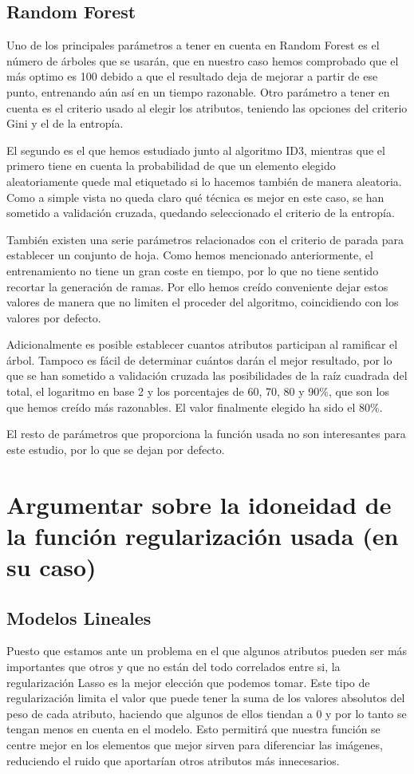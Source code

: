 \documentclass{article}
\begin{document}
	 \subsection{Random Forest}
	 Uno de los principales parámetros a tener en cuenta en Random Forest es el número de árboles que se usarán, que en nuestro caso hemos comprobado que el más optimo es 100 debido a que el resultado deja de mejorar a partir de ese punto, entrenando aún así en un tiempo razonable. Otro parámetro a tener en cuenta es el criterio usado al elegir los atributos, teniendo las opciones del criterio Gini y el de la entropía.
	 \par
	 El segundo es el que hemos estudiado junto al algoritmo ID3, mientras que el primero tiene en cuenta la probabilidad de que un elemento elegido aleatoriamente quede mal etiquetado si lo hacemos también de manera aleatoria. Como a simple vista no queda claro qué técnica es mejor en este caso, se han sometido a validación cruzada, quedando seleccionado el criterio de la entropía.
	 \par
	 También existen una serie parámetros relacionados con el criterio de parada para establecer un conjunto de hoja. Como hemos mencionado anteriormente, el entrenamiento no tiene un gran coste en tiempo, por lo que no tiene sentido recortar la generación de ramas. Por ello hemos creído conveniente dejar estos valores de manera que no limiten el proceder del algoritmo, coincidiendo con los valores por defecto.
	 \par
	 Adicionalmente es posible establecer cuantos atributos participan al ramificar el árbol. Tampoco es fácil de determinar cuántos darán el mejor resultado, por lo que se han sometido a validación cruzada las posibilidades de la raíz cuadrada del total, el logaritmo en base 2 y los porcentajes de 60, 70, 80 y 90\%, que son los que hemos creído más razonables. El valor finalmente elegido ha sido el 80\%.
	 \par
	 El resto de parámetros que proporciona la función usada no son interesantes para este estudio, por lo que se dejan por defecto.
	
	\section{Argumentar sobre la idoneidad de la función regularización usada (en su caso)} %
	\subsection{Modelos Lineales}
	Puesto que estamos ante un problema en el que algunos atributos pueden ser más importantes que otros y que no están del todo correlados entre si, la regularización Lasso es la mejor elección que podemos tomar. Este tipo de regularización limita el valor que puede tener la suma de los valores absolutos del peso de cada atributo, haciendo que algunos de ellos tiendan a 0 y por lo tanto se tengan menos en cuenta en el modelo. Esto permitirá que nuestra función se centre mejor en los elementos que mejor sirven para diferenciar las imágenes, reduciendo el ruido que aportarían otros atributos más innecesarios.
	
\end{document}
